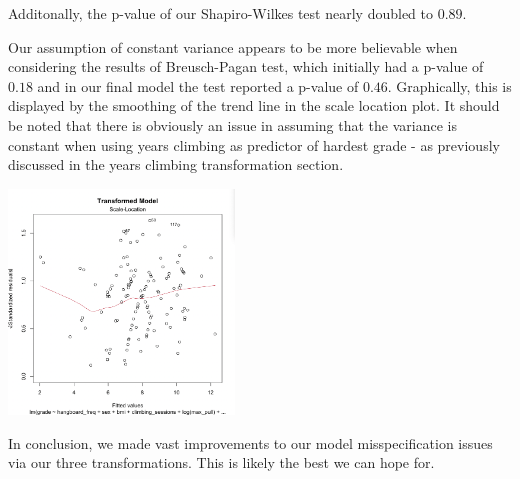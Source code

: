 \documentclass[11pt]{amsart}
\begin{document}
Additonally, the p-value of our Shapiro-Wilkes test nearly doubled to $0.89$.

Our assumption of constant variance appears to be more believable when considering the results of Breusch-Pagan test, which initially had a p-value of $0.18$ and in our final model the test reported a p-value of $0.46$.
Graphically, this is displayed by the smoothing of the trend line in the scale location plot.
It should be noted that there is obviously an issue in assuming that the variance is constant when using years climbing as predictor of hardest grade - as previously discussed in the years climbing transformation section. 



\begin{center}
\includegraphics[width=0.45\textwidth]{final_scale}
\end{center}

In conclusion, we made vast improvements to our model misspecification issues via our three transformations.
This is likely the best we can hope for.
\end{document}
